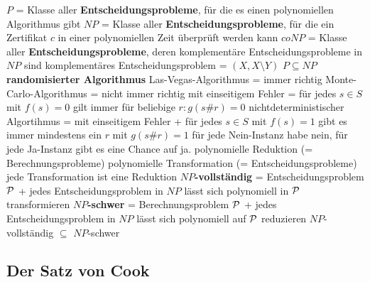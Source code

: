 \begin{outline}
    \1 $P$ = Klasse aller \textbf{Entscheidungsprobleme}, für die es einen polynomiellen Algorithmus gibt
    \1 $NP$ = Klasse aller \textbf{Entscheidungsprobleme}, für die ein Zertifikat $c$ in einer polynomiellen Zeit überprüft werden kann
    \1 $coNP$ = Klasse aller \textbf{Entscheidungsprobleme}, deren komplementäre Entscheidungsprobleme in $NP$ sind
        \2 komplementäres Entscheidungsproblem = $(X, X\setminus Y)$
    \1 $P\subseteq NP$
    \1 \textbf{randomisierter Algorithmus}
        \2 Las-Vegas-Algorithmus = immer richtig
        \2 Monte-Carlo-Algorithmus = nicht immer richtig
        \2 mit einseitigem Fehler = für jedes $s\in S$ mit $f(s)=0$ gilt immer für beliebige $r: g(s\#r)=0$
        \2 nichtdeterministischer Algortihmus = mit einseitigem Fehler + für jedes $s\in S$ mit $f(s)=1$ gibt es immer mindestens ein $r$ mit $g(s\#r)=1$ 
            \3 für jede Nein-Instanz habe nein, für jede Ja-Instanz gibt es eine Chance auf ja.
    \1 polynomielle Reduktion (= Berechnungsprobleme)
    \1 polynomielle Transformation (= Entscheidungsprobleme)
        \2 jede Transformation ist eine Reduktion
    \1 \textbf{$NP$-vollständig} = Entscheidungsproblem $\mathcal{P}$ + jedes Entscheidungsproblem in $NP$ lässt sich polynomiell in $\mathcal{P}$ transformieren 
    \1 \textbf{$NP$-schwer} = Berechnungsproblem $\mathcal{P}$ + jedes Entscheidungsproblem in $NP$ lässt sich polynomiell auf $\mathcal{P}$ reduzieren
    \1 $NP$-vollständig $\subseteq$ $NP$-schwer
\end{outline}

\subsection{Der Satz von Cook}


